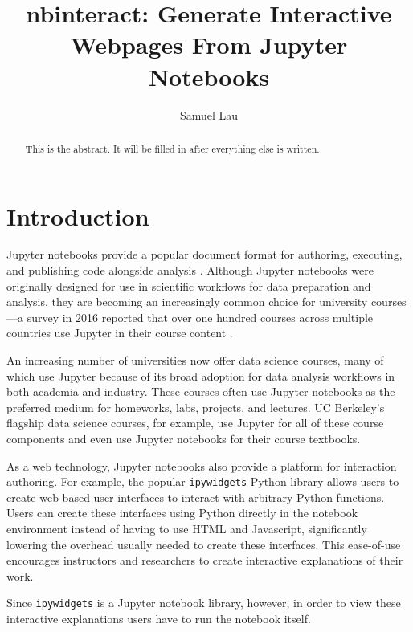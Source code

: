 \documentclass[nobib]{tufte-handout}
\title{nbinteract: Generate Interactive Webpages From Jupyter Notebooks}
\author[Samuel Lau]{Samuel Lau}
\newcommand{\code}[1]{\texttt{#1}}
\begin{document}
\maketitle%

\begin{abstract}
\noindent
This is the abstract. It will be filled in after everything else is written.
\end{abstract}

\section{Introduction} %
\label{sec:introduction}

Jupyter notebooks provide a popular document format for authoring, executing,
and publishing code alongside analysis \cite{Kluyver2016b}. Although Jupyter
notebooks were originally designed for use in scientific workflows for data
preparation and analysis, they are becoming an increasingly common choice for
university courses---a survey in 2016 reported that over one hundred courses
across multiple countries use Jupyter in their course content
\cite{Hamrick2016}.

An increasing number of universities now offer data science courses, many of
which use Jupyter because of its broad adoption for data analysis workflows in
both academia and industry. These courses often use Jupyter notebooks as the
preferred medium for homeworks, labs, projects, and lectures. UC Berkeley's
flagship data science courses, for example, use Jupyter for all of these course
components and even use Jupyter notebooks for their course textbooks.

As a web technology, Jupyter notebooks also provide a platform for interaction
authoring. For example, the popular \code{ipywidgets} Python library allows
users to create web-based user interfaces to interact with arbitrary Python
functions. Users can create these interfaces using Python directly in the
notebook environment instead of having to use HTML and Javascript,
significantly lowering the overhead usually needed to create these interfaces.
This ease-of-use encourages instructors and researchers to create interactive
explanations of their work.

Since \code{ipywidgets} is a Jupyter notebook library, however, in order to
view these interactive explanations users have to run the notebook itself.


\newpage

\printbibliography
\end{document}
